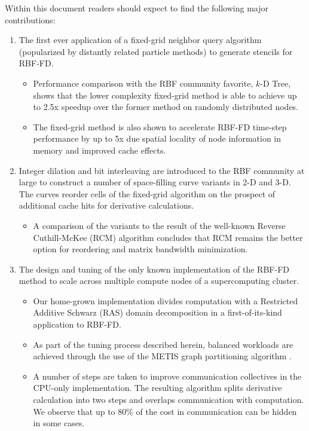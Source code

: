 \documentclass[11pt]{report}
\begin{document}
Within this document readers should expect to find the following major contributions: 
\begin{enumerate} 
\item The first ever application of a fixed-grid neighbor query algorithm (popularized by distantly related particle methods) to generate stencils for RBF-FD. 
\begin{itemize} 
\item Performance comparison with the RBF community favorite, $k$-D Tree, shows that the lower complexity fixed-grid method is able to achieve up to 2.5x speedup over the former method on randomly distributed nodes. 
\item The fixed-grid method is also shown to accelerate RBF-FD time-step performance by up to 5x due spatial locality of node information in memory and improved cache effects.
\end{itemize} 
\item Integer dilation and bit interleaving are introduced to the RBF community at large to construct a number of space-filling curve variants in 2-D and 3-D. The curves reorder cells of the fixed-grid algorithm on the prospect of additional cache hits for derivative calculations. 
\begin{itemize} 
\item A comparison of the variants to the result of the well-known Reverse Cuthill-McKee (RCM) algorithm concludes that RCM remains the better option for reordering and matrix bandwidth minimization.
\end{itemize} 
\item The design and tuning of the only known implementation of the RBF-FD method to scale across multiple compute nodes of a supercomputing cluster.
\begin{itemize} 
\item Our home-grown implementation divides computation with a Restricted Additive Schwarz (RAS) domain decomposition in a first-of-its-kind application to RBF-FD. %
\item As part of the tuning process described herein, balanced workloads are achieved through the use of the METIS graph partitioning algorithm \cite{Karypis1999}.  
\item A number of steps are taken to improve communication collectives in the CPU-only implementation. The resulting algorithm splits derivative calculation into two steps and overlaps communication with computation. We observe that up to 80\% of the cost in communication can be hidden in some cases. 

\end{itemize}
\end{enumerate}
\end{document}

